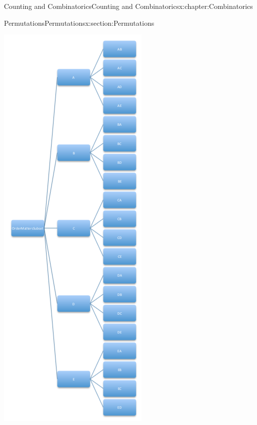 \documentclass[oneside,10pt,]{book}
\numberwithin{equation}{section}
\begin{document}
\begin{chapterptx}{Counting and Combinatorics}{}{Counting and Combinatorics}{}{}{x:chapter:Combinatorics}
\begin{sectionptx}{Permutations}{}{Permutations}{}{}{x:section:Permutations}
\begin{image}{0.25}{0.5}{0.25}
\includegraphics[width=\linewidth]{images/PermutationSubTree.png}

\end{image}
\end{sectionptx}
\end{chapterptx}
\end{document}
